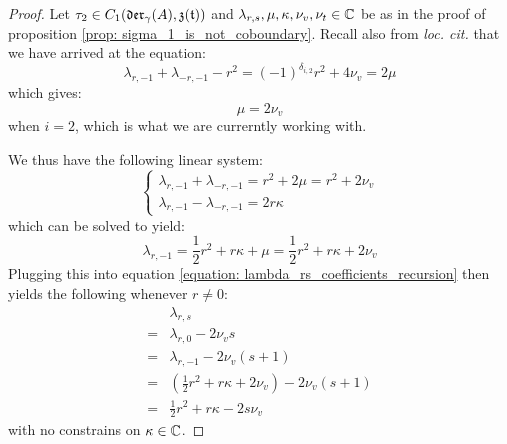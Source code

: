             \begin{proof}
                Let $\tau_2 \in C_1(\mathfrak{der}_{\gamma}(A), \mathfrak{z}(\mathfrak{t}))$ and $\lambda_{r, s}, \mu, \kappa, \nu_v, \nu_t \in \mathbb{C}$ be as in the proof of proposition \ref{prop: sigma_1_is_not_coboundary}. Recall also from \textit{loc. cit.} that we have arrived at the equation:
                    $$\lambda_{r, -1} + \lambda_{-r, -1} - r^2 = (-1)^{\delta_{i, 2}} r^2 + 4\nu_v = 2\mu$$
                which gives:
                    $$\mu = 2\nu_v$$
                when $i = 2$, which is what we are currerntly working with.
                
                We thus have the following linear system:
                    $$
                        \begin{cases}
                            \lambda_{r, -1} + \lambda_{-r, -1} = r^2 + 2\mu = r^2 + 2 \nu_v
                            \\
                            \lambda_{r, -1} - \lambda_{-r, -1} = 2r\kappa
                        \end{cases}
                    $$
                which can be solved to yield:
                    $$\lambda_{r, -1} = \frac12 r^2 + r\kappa + \mu = \frac12 r^2 + r\kappa + 2\nu_v$$
                Plugging this into equation \eqref{equation: lambda_rs_coefficients_recursion} then yields the following whenever $r \not = 0$:
                    $$
                        \begin{aligned}
                            & \lambda_{r, s}
                            \\
                            = & \lambda_{r, 0} - 2\nu_v s
                            \\
                            = & \lambda_{r, -1} - 2 \nu_v (s + 1)
                            \\
                            = & \left( \frac12 r^2 + r\kappa + 2\nu_v \right) - 2 \nu_v (s + 1)
                            \\
                            = & \frac12 r^2 + r\kappa - 2s \nu_v
                        \end{aligned} 
                    $$
                with no constrains on $\kappa \in \mathbb{C}$. 


\end{proof}
